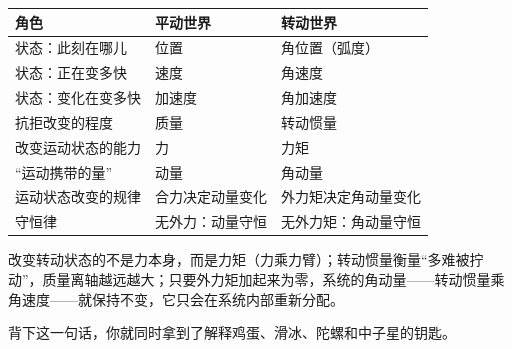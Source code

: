 \begin{center}
\begin{tabular}{lll}
\toprule
\textbf{角色} & \textbf{平动世界} & \textbf{转动世界} \\
\midrule
状态：此刻在哪儿 & 位置 & 角位置（弧度） \\
状态：正在变多快 & 速度 & 角速度 \\
状态：变化在变多快 & 加速度 & 角加速度 \\
抗拒改变的程度 & 质量 & 转动惯量 \\
改变运动状态的能力 & 力 & 力矩 \\
“运动携带的量” & 动量 & 角动量 \\
运动状态改变的规律 & 合力决定动量变化 & 外力矩决定角动量变化 \\
守恒律 & 无外力：动量守恒 & 无外力矩：角动量守恒 \\
\bottomrule
\end{tabular}
\end{center}


\begin{oneline}
改变转动状态的不是力本身，而是力矩（力乘力臂）；转动惯量衡量“多难被拧动”，质量离轴越远越大；只要外力矩加起来为零，系统的角动量——转动惯量乘角速度——就保持不变，它只会在系统内部重新分配。
\end{oneline}

背下这一句话，你就同时拿到了解释鸡蛋、滑冰、陀螺和中子星的钥匙。


